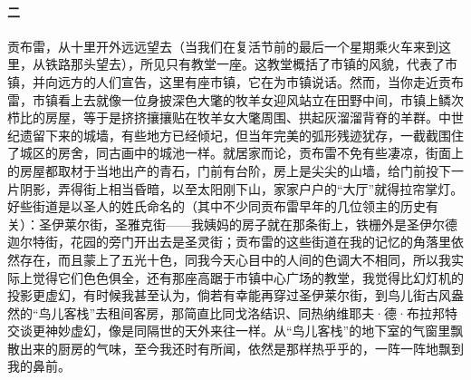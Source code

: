\paragraph*{二}
\par 贡布雷，从十里开外远远望去（当我们在复活节前的最后一个星期乘火车来到这里，从铁路那头望去），所见只有教堂一座。这教堂概括了市镇的风貌，代表了市镇，并向远方的人们宣告，这里有座市镇，它在为市镇说话。然而，当你走近贡布雷，市镇看上去就像一位身披深色大氅的牧羊女迎风站立在田野中间，市镇上鳞次栉比的房屋，等于是挤挤攘攘贴在牧羊女大氅周围、拱起灰溜溜背脊的羊群。中世纪遗留下来的城墙，有些地方已经倾圮，但当年完美的弧形残迹犹存，一截截围住了城区的房舍，同古画中的城池一样。就居家而论，贡布雷不免有些凄凉，街面上的房屋都取材于当地出产的青石，门前有台阶，房上是尖尖的山墙，给门前投下一片阴影，弄得街上相当昏暗，以至太阳刚下山，家家户户的“大厅”就得拉帘掌灯。好些街道是以圣人的姓氏命名的（其中不少同贡布雷早年的几位领主的历史有关）：圣伊莱尔街，圣雅克街——我姨妈的房子就在那条街上，铁栅外是圣伊尔德迦尔特街，花园的旁门开出去是圣灵街；贡布雷的这些街道在我的记忆的角落里依然存在，而且蒙上了五光十色，同我今天心目中的人间的色调大不相同，所以我实际上觉得它们色色俱全，还有那座高踞于市镇中心广场的教堂，我觉得比幻灯机的投影更虚幻，有时候我甚至认为，倘若有幸能再穿过圣伊莱尔街，到鸟儿街古风盎然的“鸟儿客栈”去租间客房，那简直比同戈洛结识、同热纳维耶夫·德·布拉邦特交谈更神妙虚幻，像是同隔世的天外来往一样。从“鸟儿客栈”的地下室的气窗里飘散出来的厨房的气味，至今我还时有所闻，依然是那样热乎乎的，一阵一阵地飘到我的鼻前。
